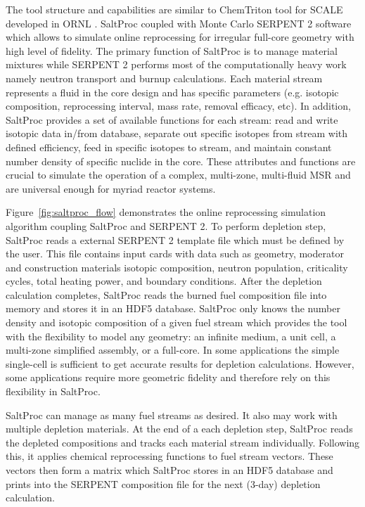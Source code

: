 The tool structure and capabilities are similar to ChemTriton tool for SCALE developed in \gls{ORNL} \cite{powers_new_2013}. SaltProc coupled with Monte Carlo SERPENT 2 software which allows to simulate online reprocessing for irregular full-core geometry with high level of fidelity.  The primary function of SaltProc is to manage material mixtures while SERPENT 2 performs most of the computationally heavy work namely neutron transport and burnup calculations. Each material stream represents a fluid in the core design and has specific parameters (e.g. isotopic composition, reprocessing interval, mass rate, removal efficacy, etc). In addition, SaltProc provides a set of available functions for each stream: read and write isotopic data in/from database, separate out specific isotopes from stream with defined efficiency, feed in specific isotopes to stream, and maintain constant number density of specific nuclide in the core. These attributes and functions are crucial to simulate the operation of a complex, multi-zone, multi-fluid \gls{MSR} and are universal enough for myriad reactor systems.

Figure~\ref{fig:saltproc_flow} demonstrates the  online reprocessing simulation algorithm coupling SaltProc and SERPENT 2. To perform depletion step, SaltProc reads a external SERPENT 2 template file which must be defined by the user. This file contains input cards with data such as geometry, moderator and construction materials isotopic composition, neutron population, criticality cycles, total heating power, and boundary conditions. After the depletion calculation completes, SaltProc reads the burned fuel composition file into memory and stores it in an HDF5 database. SaltProc only knows the number density and isotopic composition of a given fuel stream which provides the tool with the flexibility to model any geometry: an infinite medium, a unit cell, a multi-zone simplified assembly, or a full-core. In some applications the simple single-cell is sufficient to get accurate results for depletion calculations. However, some applications require more geometric fidelity and therefore rely on this flexibility in SaltProc.

SaltProc can manage as many fuel streams as desired. It also may work with multiple depletion materials. At the end of a each depletion step, SaltProc reads the depleted compositions and tracks each material stream individually. Following this, it applies chemical reprocessing functions to fuel stream vectors. These vectors then form a matrix which SaltProc stores in an HDF5 database and prints into the SERPENT composition file for the next (3-day) depletion calculation.

